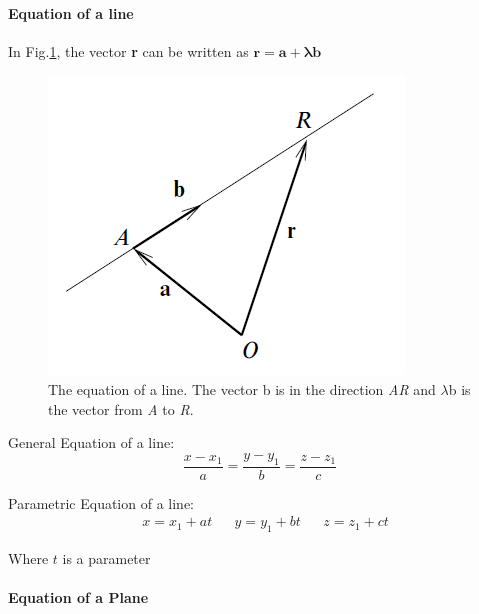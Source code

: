 \paragraph{Equation of a line}
In Fig.\ref{eqnline}, the vector {\bfseries r} can be written as $\mathbf{r} = \mathbf{a + \lambda b}$
\begin{figure}[H]
	\centering
	\includegraphics[scale=0.75]{figures/line}
	\caption{\label{eqnline} The equation of a line. The vector b is in the direction \emph{AR} and $\mathcal{\lambda}$b is the vector from \emph{A} to \emph{R}.}
\end{figure}
General Equation of a line:
$$\frac{x-x_1}{a} = \frac{y- y_1}{b} = \frac{z-z_1}{c}$$

Parametric Equation of a line:
\begin{align*}
	&x = x_1 + at & &y= y_1 +bt & &z= z_1 +ct
\end{align*}

Where $t$ is a parameter
\paragraph{Equation of a Plane}

